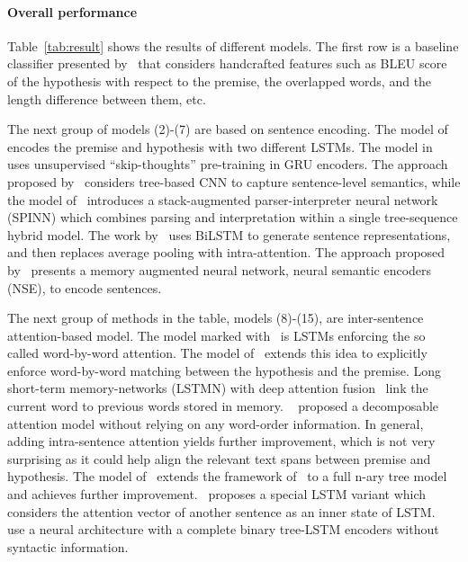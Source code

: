\documentclass[11pt,a4paper]{article}
\begin{document}
\paragraph{Overall performance}
Table~\ref{tab:result} shows the results of different models. The first row is a baseline classifier presented by~\citet{Bowman:D15-1075} that considers handcrafted features such as BLEU score of the hypothesis with respect to the premise, the overlapped words, and the length difference between them, etc.  

The next group of models (2)-(7) are based on sentence encoding. The model of~\citet{Bowman:P16-1139} encodes the premise and hypothesis with two different LSTMs. The model in~\citet{DBLP:journals/corr/VendrovKFU15} uses unsupervised ``skip-thoughts'' pre-training in GRU encoders. The approach proposed by~\citet{Mou:P16-2022} considers tree-based CNN to capture sentence-level semantics, while the model of~\citet{Bowman:P16-1139} introduces a stack-augmented parser-interpreter neural network (SPINN) which combines parsing and interpretation within a single tree-sequence hybrid model. The work by~\citet{DBLP:journals/corr/LiuSLW16} uses BiLSTM to generate sentence representations, and then replaces average pooling with intra-attention. The approach proposed by~\citet{DBLP:journals/corr/MunkhdalaiY16} presents a memory augmented neural network, neural semantic encoders (NSE), to encode sentences.

The next group of methods in the table, models (8)-(15), are inter-sentence attention-based model. The model marked with~\citet{DBLP:journals/corr/RocktaschelGHKB15} is LSTMs enforcing the so called word-by-word attention. The model of~\citet{Wang:N16-1170} extends this idea to explicitly enforce word-by-word matching between the hypothesis and the premise. Long short-term memory-networks (LSTMN) with deep attention fusion~\citep{Cheng:D16-1053} link the current word to previous words stored in memory. 
~\citet{Parikh:D16-1244} proposed a decomposable attention model without relying on any word-order information. In general, adding intra-sentence attention yields further improvement, which is not very surprising as it could help align the relevant text spans between premise and hypothesis. The model of~\citet{DBLP:journals/corr/MunkhdalaiY16b} extends the framework of~\citet{Wang:N16-1170} to a full n-ary tree model and achieves further improvement.~\citet{Sha:C16-1270} proposes a special LSTM variant which considers the attention vector of another sentence as an inner state of LSTM.~\citet{DBLP:journals/corr/PariaADCP16} use a neural architecture with a complete binary tree-LSTM encoders without syntactic information.
\end{document}
